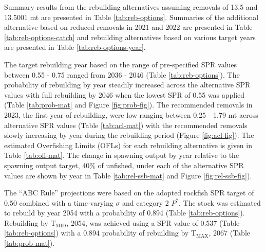 \documentclass[11pt,
  english,
  a4paper,
]{article}
\begin{document}
\leavevmode\tagmcend\tagstructend\par


Summary results from the rebuilding alternatives assuming removals of 13.5 and 13.5001 mt are presented in Table \ref{tab:reb-options}. Summaries of the additional alternative based on reduced removals in 2021 and 2022 are presented in Table \ref{tab:reb-options-catch} and rebuilding alternatives based on various target years are presented in Table \ref{tab:reb-options-year}.

\leavevmode\tagmcend\tagstructend\par


The target rebuilding year based on the range of pre-specified SPR values between 0.55 - 0.75 ranged from 2036 - 2046 (Table \ref{tab:reb-options}). The probability of rebuilding by year steadily increased across the alternative SPR values with full rebuilding by 2046 when the lowest SPR of 0.55 was applied (Table \ref{tab:prob-mat} and Figure \ref{fig:prob-fig}). The recommended removals in 2023, the first year of rebuilding, were low ranging between 0.25 - 1.79 mt across alternative SPR values (Table \ref{tab:acl-mat}) with the recommended removals slowly increasing by year during the rebuilding period (Figure \ref{fig:acl-fig}). The estimated Overfishing Limits (OFLs) for each rebuilding alternative is given in Table \ref{tab:ofl-mat}. The change in spawning output by year relative to the spawning output target, 40\% of unfished, under each of the alternative SPR values are shown by year in Table \ref{tab:rel-ssb-mat} and Figure \ref{fig:rel-ssb-fig}).

\leavevmode\tagmcend\tagstructend\par


The ``ABC Rule'' projections were based on the adopted rockfish SPR target of 0.50 combined with a time-varying {\(\sigma\)\leavevmode\tagmcend\tagstructend} and category 2 {\(P^*\)\leavevmode\tagmcend\tagstructend}. The stock was estimated to rebuild by year 2054 with a probability of 0.894 (Table \ref{tab:reb-options}). Rebuilding by {\(\text{T}_\text{MID}\)\leavevmode\tagmcend\tagstructend}, 2054, was achieved using a SPR value of 0.537 (Table \ref{tab:reb-options}) with a 0.894 probability of rebuilding by {\(\text{T}_\text{MAX}\)\leavevmode\tagmcend\tagstructend}, 2067 (Table \ref{tab:prob-mat}).
\end{document}

